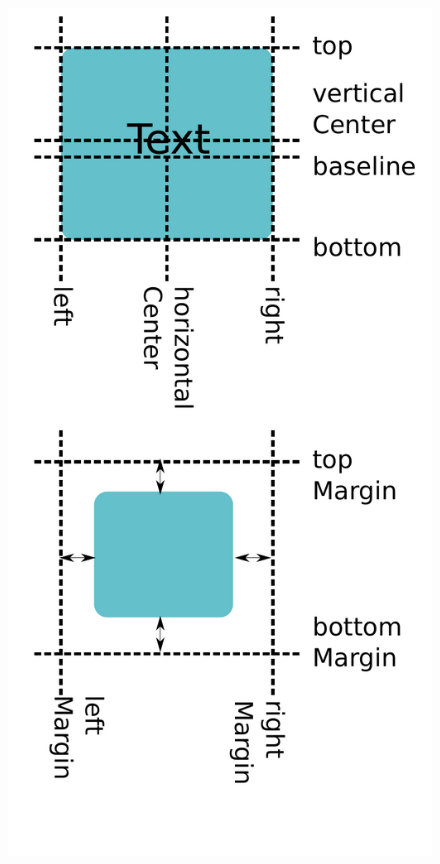 \begin{frame}
\begin{columns}
\begin{column}{0.32\textwidth}
\begin{figure}[!t]
      \includegraphics[width=\textwidth]{images/anchors.pdf}
      \end{figure}
    \end{column}
  \end{columns}
\end{frame}

